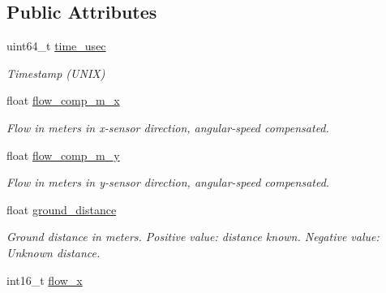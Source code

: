 \subsection*{Public Attributes}
\begin{DoxyCompactItemize}
\item 
\hypertarget{struct____mavlink__hil__optical__flow__t_abff1e3e4ebe3954eafe38491afdf10ee}{uint64\+\_\+t \hyperlink{struct____mavlink__hil__optical__flow__t_abff1e3e4ebe3954eafe38491afdf10ee}{time\+\_\+usec}}\label{struct____mavlink__hil__optical__flow__t_abff1e3e4ebe3954eafe38491afdf10ee}

\begin{DoxyCompactList}\small\item\em Timestamp (U\+N\+I\+X) \end{DoxyCompactList}\item 
\hypertarget{struct____mavlink__hil__optical__flow__t_acbc49d0debcfc63fddaf3194dcd964b2}{float \hyperlink{struct____mavlink__hil__optical__flow__t_acbc49d0debcfc63fddaf3194dcd964b2}{flow\+\_\+comp\+\_\+m\+\_\+x}}\label{struct____mavlink__hil__optical__flow__t_acbc49d0debcfc63fddaf3194dcd964b2}

\begin{DoxyCompactList}\small\item\em Flow in meters in x-\/sensor direction, angular-\/speed compensated. \end{DoxyCompactList}\item 
\hypertarget{struct____mavlink__hil__optical__flow__t_a474bf94c0c879bb240f4554e379073c5}{float \hyperlink{struct____mavlink__hil__optical__flow__t_a474bf94c0c879bb240f4554e379073c5}{flow\+\_\+comp\+\_\+m\+\_\+y}}\label{struct____mavlink__hil__optical__flow__t_a474bf94c0c879bb240f4554e379073c5}

\begin{DoxyCompactList}\small\item\em Flow in meters in y-\/sensor direction, angular-\/speed compensated. \end{DoxyCompactList}\item 
\hypertarget{struct____mavlink__hil__optical__flow__t_a0f4705c5970a0f4c6f75d93560fc0374}{float \hyperlink{struct____mavlink__hil__optical__flow__t_a0f4705c5970a0f4c6f75d93560fc0374}{ground\+\_\+distance}}\label{struct____mavlink__hil__optical__flow__t_a0f4705c5970a0f4c6f75d93560fc0374}

\begin{DoxyCompactList}\small\item\em Ground distance in meters. Positive value\+: distance known. Negative value\+: Unknown distance. \end{DoxyCompactList}\item 
\hypertarget{struct____mavlink__hil__optical__flow__t_a1592e86fb36d936682ecf4a9b4724a0a}{int16\+\_\+t \hyperlink{struct____mavlink__hil__optical__flow__t_a1592e86fb36d936682ecf4a9b4724a0a}{flow\+\_\+x}}\label{struct____mavlink__hil__optical__flow__t_a1592e86fb36d936682ecf4a9b4724a0a}


\end{DoxyCompactItemize}
